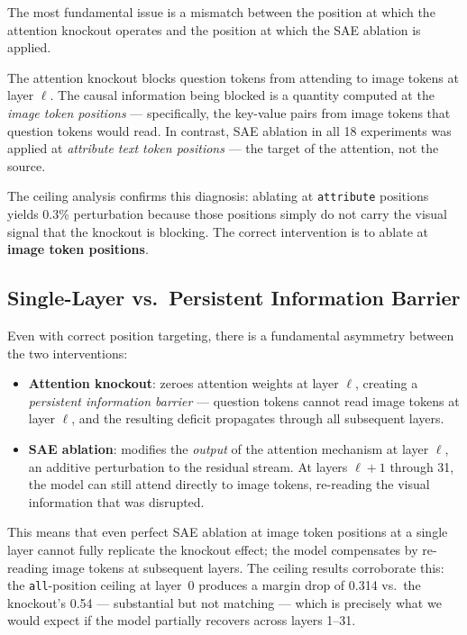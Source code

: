 \documentclass[11pt,a4paper]{article}
\begin{document}
The most fundamental issue is a mismatch between the position at which the attention knockout
operates and the position at which the SAE ablation is applied.

The attention knockout blocks question tokens from attending to image tokens at layer $\ell$.
The causal information being blocked is a quantity computed at the \emph{image token positions} —
specifically, the key-value pairs from image tokens that question tokens would read.
In contrast, SAE ablation in all 18 experiments was applied at \emph{attribute text token
positions} — the target of the attention, not the source.

The ceiling analysis confirms this diagnosis: ablating at \texttt{attribute} positions yields 0.3\%
perturbation because those positions simply do not carry the visual signal that the knockout is
blocking. The correct intervention is to ablate at \textbf{image token positions}.

\subsection{Single-Layer vs.\ Persistent Information Barrier}

Even with correct position targeting, there is a fundamental asymmetry between the two
interventions:
\begin{itemize}[noitemsep]
  \item \textbf{Attention knockout}: zeroes attention weights at layer $\ell$, creating a
    \emph{persistent information barrier} — question tokens cannot read image tokens at layer $\ell$,
    and the resulting deficit propagates through all subsequent layers.
  \item \textbf{SAE ablation}: modifies the \emph{output} of the attention mechanism at layer $\ell$,
    an additive perturbation to the residual stream. At layers $\ell+1$ through 31, the model can
    still attend directly to image tokens, re-reading the visual information that was disrupted.
\end{itemize}
This means that even perfect SAE ablation at image token positions at a single layer cannot fully
replicate the knockout effect; the model compensates by re-reading image tokens at subsequent layers.
The ceiling results corroborate this: the \texttt{all}-position ceiling at layer~0 produces a margin
drop of 0.314 vs.\ the knockout's 0.54 — substantial but not matching — which is precisely what we
would expect if the model partially recovers across layers 1--31.
\end{document}
